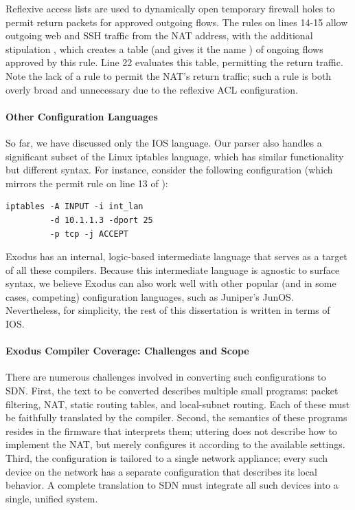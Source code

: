 Reflexive access lists are used to dynamically open temporary
firewall holes to permit return packets for approved outgoing flows.
The rules on lines 14-15 allow outgoing
web and SSH traffic from the NAT address, with the additional stipulation ,
which creates a table (and gives it the name ) of ongoing
flows approved by this rule. Line 22 evaluates this table, permitting the return
traffic. Note the lack of a  rule to permit the NAT's return traffic; such a
rule is both overly broad and unnecessary due to the reflexive ACL configuration.


\paragraph{Other Configuration Languages}

So far, we have discussed only the IOS language. Our parser also
handles a significant subset of the Linux iptables language, which has
similar functionality but different syntax. For instance, consider the
following configuration (which mirrors the permit rule on line 13 of ):

\begin{lstlisting}[label=lst:iptables,language=IOS]
iptables -A INPUT -i int_lan 
         -d 10.1.1.3 -dport 25 
         -p tcp -j ACCEPT
\end{lstlisting}

\noindent
Exodus has an internal, logic-based intermediate language that serves
as a target of all these compilers. Because this intermediate language
is agnostic to surface syntax, we believe Exodus can also work
well with other popular (and in some cases, competing) configuration
languages, such as Juniper's JunOS. Nevertheless, for simplicity, the
rest of this dissertation is written in terms of IOS.

\paragraph{Exodus Compiler Coverage: Challenges and Scope}

There are numerous challenges involved in converting such configurations to
SDN. First, the text to be converted describes multiple small programs: packet
filtering, NAT, static routing tables, and local-subnet routing. Each of these must
be faithfully translated by the compiler. Second, the semantics of these
programs resides in the firmware that interprets them; uttering  does not describe how to implement the NAT, but merely configures it
according to the available settings. Third, the configuration is tailored to
a single network appliance; every such device on the network has a separate
configuration that describes its local behavior. A complete translation to SDN must
integrate all such devices into a single, unified system.

